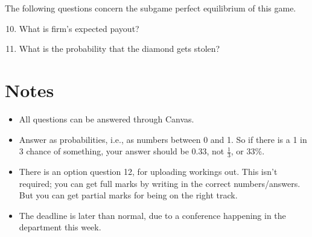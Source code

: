 The following questions concern the subgame perfect equilibrium of this game.

\begin{enumerate}
\setcounter{enumi}{9}
\item{} What is firm's expected payout?

\item{} What is the probability that the diamond gets stolen?

\end{enumerate}

\section*{Notes}

\begin{itemize}

\item All questions can be answered through Canvas.
\item Answer as probabilities, i.e., as numbers between 0 and 1. So if there is a 1 in 3 chance of something, your answer should be 0.33, not $\frac{1}{3}$, or 33\%.
\item There is an option question 12, for uploading workings out. This isn't required; you can get full marks by writing in the correct numbers/answers. But you can get partial marks for being on the right track.
\item The deadline is later than normal, due to a conference happening in the department this week.
\end{itemize} 


